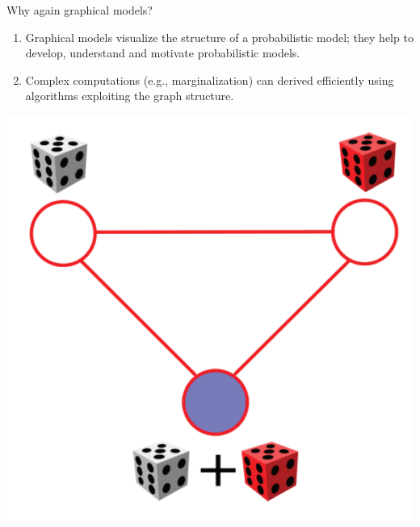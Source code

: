\begin{frame}{Why again graphical models?}
    
    \begin{minipage}{.62\textwidth}
    \begin{enumerate}\itemsep2ex
    \item Graphical models visualize the structure of a probabilistic
    model; they help to develop, understand and motivate probabilistic models.
    \pause
    \item Complex computations (e.g., marginalization)
    can derived efficiently
    using algorithms exploiting the graph structure.
    \end{enumerate}
    \end{minipage}
    \hfill\begin{minipage}{.33\textwidth}
    \phantom{mini}
    
    \hfill\includegraphics[width=.95\textwidth]{plots/FigureDice}
    \end{minipage}

\end{frame}


